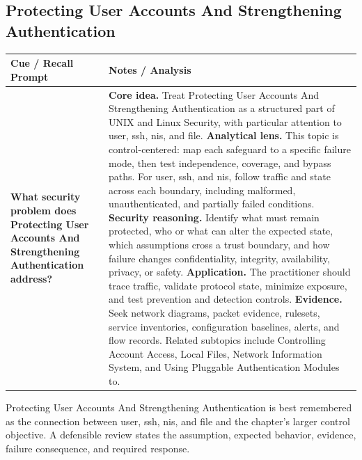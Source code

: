 \documentclass[11pt]{article}
\newcommand{\CornellHeader}{%
\rowcolor{Navy}\color{white}\bfseries Cue / Recall Prompt & \color{white}\bfseries Notes / Analysis\\\hline}
\newcommand{\CornellRow}[2]{%
\cellcolor{CueGray}\RaggedRight\textbf{#1} & \RaggedRight #2\\\hline}
\begin{document}
\subsection*{Protecting User Accounts And Strengthening Authentication}
\begin{longtable}{>{\RaggedRight\arraybackslash}p{}|>{\RaggedRight\arraybackslash}p{}}
\CornellHeader
\CornellRow{What security problem does Protecting User Accounts And Strengthening Authentication address?}{\textbf{Core idea.} Treat Protecting User Accounts And Strengthening Authentication as a structured part of UNIX and Linux Security, with particular attention to user, ssh, nis, and file. \textbf{Analytical lens.} This topic is control-centered: map each safeguard to a specific failure mode, then test independence, coverage, and bypass paths. For user, ssh, and nis, follow traffic and state across each boundary, including malformed, unauthenticated, and partially failed conditions. \textbf{Security reasoning.} Identify what must remain protected, who or what can alter the expected state, which assumptions cross a trust boundary, and how failure changes confidentiality, integrity, availability, privacy, or safety. \textbf{Application.} The practitioner should trace traffic, validate protocol state, minimize exposure, and test prevention and detection controls. \textbf{Evidence.} Seek network diagrams, packet evidence, rulesets, service inventories, configuration baselines, alerts, and flow records. Related subtopics include Controlling Account Access, Local Files, Network Information System, and Using Pluggable Authentication Modules to.}
\end{longtable}
\begin{topicsummary}
Protecting User Accounts And Strengthening Authentication is best remembered as the connection between user, ssh, nis, and file and the chapter's larger control objective. A defensible review states the assumption, expected behavior, evidence, failure consequence, and required response.
\end{topicsummary}
\end{document}
